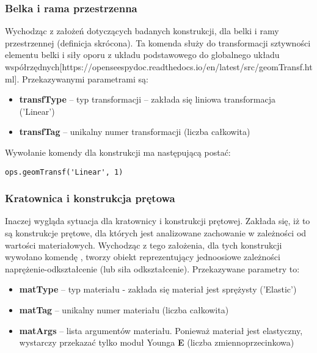 \subsubsection*{Belka i rama przestrzenna}

Wychodząc z założeń dotyczących badanych konstrukcji, dla belki i ramy przestrzennej  (definicja skrócona).
Ta komenda służy do transformacji sztywności elementu belki i siły oporu z układu podstawowego do globalnego układu współrzędnych[https://openseespydoc.readthedocs.io/en/latest/src/geomTransf.html].
Przekazywanymi parametrami są:

\begin{itemize}
    \item \textbf{transfType} – typ transformacji – zakłada się liniowa transformacja ('Linear')
    \item \textbf{transfTag} – unikalny numer transformacji (liczba całkowita)
\end{itemize}

Wywołanie komendy dla konstrukcji ma następującą postać:

\begin{lstlisting}
ops.geomTransf('Linear', 1)
\end{lstlisting}

\subsubsection*{Kratownica i konstrukcja prętowa}

Inaczej wygląda sytuacja dla kratownicy i konstrukcji prętowej.
Zakłada się, iż to są konstrukcje prętowe, dla których jest analizowane zachowanie w zależności od wartości materiałowych.
Wychodząc z tego założenia, dla tych konstrukcji wywołano komendę ,
tworzy obiekt reprezentujący jednoosiowe zależności naprężenie-odkształcenie (lub siła odkształcenie).
Przekazywane parametry to:

\begin{itemize}
    \item \textbf{matType} – typ materiału - zakłada się materiał jest sprężysty ('Elastic')
    \item \textbf{matTag} – unikalny numer materiału (liczba całkowita)
    \item \textbf{matArgs} – lista argumentów materiału. Ponieważ materiał jest elastyczny, wystarczy przekazać tylko moduł Younga \textbf{E} (liczba zmiennoprzecinkowa)
\end{itemize}

